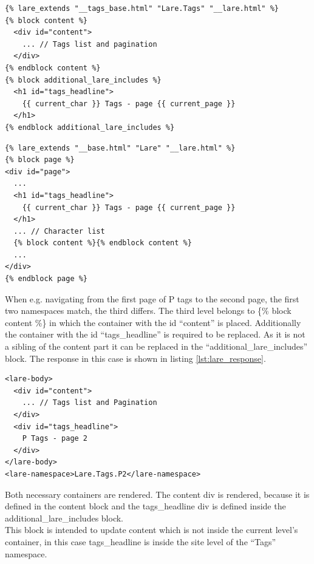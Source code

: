 \begin{minipage}[c]{0.95\linewidth}
\begin{lstlisting}[caption=tags.html, label=lst:tags_template]
{% lare_extends "__tags_base.html" "Lare.Tags" "__lare.html" %}
{% block content %}
  <div id="content">
    ... // Tags list and pagination
  </div>
{% endblock content %}
{% block additional_lare_includes %}
  <h1 id="tags_headline">
    {{ current_char }} Tags - page {{ current_page }}
  </h1>
{% endblock additional_lare_includes %}
\end{lstlisting}
\end{minipage}


\begin{minipage}[c]{0.95\linewidth}
\begin{lstlisting}[caption=\_\_tags\_base.html, label=lst:tags_base_template]
{% lare_extends "__base.html" "Lare" "__lare.html" %}
{% block page %}
<div id="page">
  ...
  <h1 id="tags_headline">
    {{ current_char }} Tags - page {{ current_page }}
  </h1>
  ... // Character list
  {% block content %}{% endblock content %}
  ...
</div>
{% endblock page %}
\end{lstlisting}
\end{minipage}

\noindent{}When e.g. navigating from the first page of P tags to the second page, the first two namespaces match, the third differs.
The third level belongs to \{\% block content \%\} in which the container with the id \enquote{content} is placed.
Additionally the container with the id \enquote{tags\_headline} is required to be replaced. As it is not a sibling of the content part it can be replaced in the \enquote{additional\_lare\_includes} block.
The response in this case is shown in listing \ref{lst:lare_response}.

\begin{minipage}[c]{0.95\linewidth}
\begin{lstlisting}[caption=Example Lare Response, label=lst:lare_response]
<lare-body>
  <div id="content">
    ... // Tags list and Pagination
  </div>
  <div id="tags_headline">
    P Tags - page 2
  </div>
</lare-body>
<lare-namespace>Lare.Tags.P2</lare-namespace>
\end{lstlisting}
\end{minipage}

\noindent{}Both necessary containers are rendered.
The content div is rendered, because it is defined in the content block and the tags\_headline div is defined inside the additional\_lare\_includes block.
\\
This block is intended to update content which is not inside the current level's container, in this case tags\_headline is inside the site level of the \enquote{Tags} namespace.
